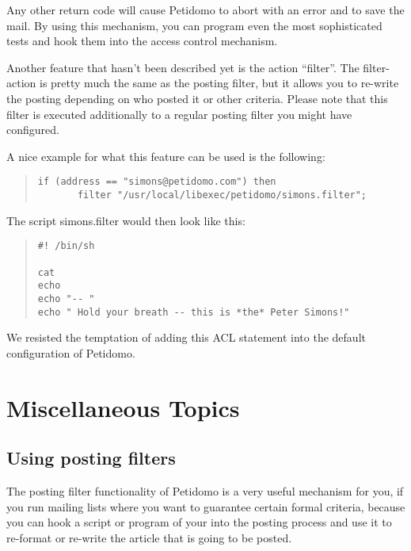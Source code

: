 \documentclass[a4paper,10pt]{scrreprt}
\newcommand{\file}[1]{{\sf #1}}
\begin{document}
Any other return code will cause Petidomo to abort with an error and
to save the mail. By using this mechanism, you can program even the
most sophisticated tests and hook them into the access control
mechanism.

Another feature that hasn't been described yet is the action
``filter''. The filter-action is pretty much the same as the posting
filter, but it allows you to re-write the posting depending on who
posted it or other criteria. Please note that this filter is executed
additionally to a regular posting filter you might have configured.

A nice example for what this feature can be used is the following:
\begin{quote}
\begin{verbatim}
if (address == "simons@petidomo.com") then
       filter "/usr/local/libexec/petidomo/simons.filter";
\end{verbatim}
\end{quote}

The script \file{simons.filter} would then look like this:
\begin{quote}
\begin{verbatim}
#! /bin/sh

cat
echo
echo "-- "
echo " Hold your breath -- this is *the* Peter Simons!"
\end{verbatim}
\end{quote}

We resisted the temptation of adding this ACL statement into the
default configuration of Petidomo.

%
\chapter{Miscellaneous Topics}
\section{Using posting filters}
\label{using posting filters}

The posting filter functionality of Petidomo is a very useful
mechanism for you, if you run mailing lists where you want to
guarantee certain formal criteria, because you can hook a script or
program of your into the posting process and use it to re-format or
re-write the article that is going to be posted.
\end{document}
